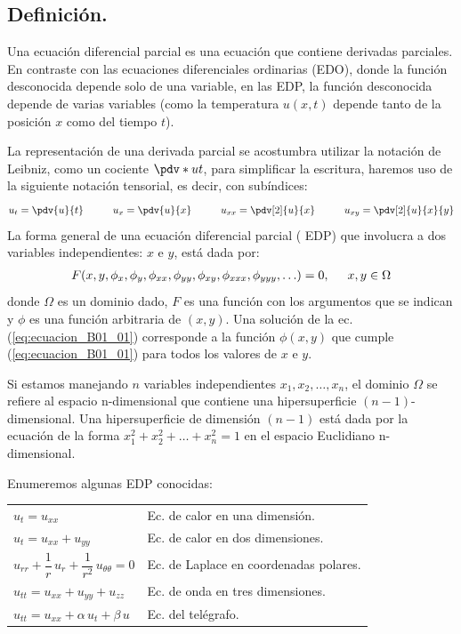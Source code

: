 \subsection*{Definición.}
Una ecuación diferencial parcial es una ecuación que contiene derivadas parciales. En contraste con las ecuaciones diferenciales ordinarias (EDO), donde la función desconocida depende solo de una variable, en las EDP, la función desconocida depende de varias variables (como la temperatura $u (x, t)$ depende tanto de la posición $x$ como del tiempo $t$).
\par
La representación de una derivada parcial se acostumbra utilizar la notación de Leibniz, como un cociente $\pdv*{u}{t}$, para simplificar la escritura, haremos uso de la siguiente notación tensorial, es decir, con subíndices:
\begin{align*}
u_{t} = \pdv{u}{t} \hspace{1cm} u_{x} = \pdv{u}{x} \hspace{1cm} u_{xx} = \pdv[2]{u}{x} \hspace{1cm} u_{xy} = \pdv[2]{u}{x}{y}
\end{align*}
La forma general de una ecuación diferencial parcial ( EDP) que involucra a dos variables independientes: $x$ e $y$, está dada por:
\begin{align}
F(x, y, \phi_{x}, \phi_{y}, \phi_{xx}, \phi_{yy}, \phi_{xy}, \phi_{xxx}, \phi_{yyy}, \ldots) = 0, \hspace{0.5cm} x, y \in \Omega
\label{eq:ecuacion_B01_01}
\end{align}
donde $\Omega$ es un dominio dado, $F$ es una función con los argumentos que se indican y $\phi$ es una función arbitraria de $(x, y)$. Una solución de la ec. (\ref{eq:ecuacion_B01_01}) corresponde a la función $\phi(x, y)$ que cumple (\ref{eq:ecuacion_B01_01}) para todos los valores de $x$ e $y$.
\par
Si estamos manejando $n$ variables independientes $x_{1}, x_{2}, \ldots, x_{n}$, el dominio $\Omega$ se refiere al espacio n-dimensional que contiene una hipersuperficie $(n-1)$-dimensional. Una hipersuperficie de dimensión $(n-1)$ está dada por la ecuación de la forma $x_{1}^{2} + x_{2}^{2} + \ldots + x_{n}^{2} = 1$ en el espacio Euclidiano n-dimensional.
\par
Enumeremos algunas EDP conocidas:
\begin{table}[H]
\centering
\large
\setlength{\extrarowheight}{1em}
\begin{tabular}{l l}
{\Large{$u_{t} = u_{xx}$}} & Ec. de calor en una dimensión. \\
\Large{$u_{t} = u_{xx} + u_{yy}$} & Ec. de calor en dos dimensiones. \\
\large{$u_{rr} + \dfrac{1}{r} \, u_{r} + \dfrac{1}{r^{2}} \, u_{\theta \theta} = 0$} & Ec. de Laplace en coordenadas polares. \\
\Large{$u_{tt} = u_{xx} + u_{yy} + u_{zz}$} & Ec. de onda en tres dimensiones. \\
\Large{$u_{tt} = u_{xx} + \alpha \, u_{t} + \beta \, u$} & Ec. del telégrafo.
\end{tabular}
\end{table}

